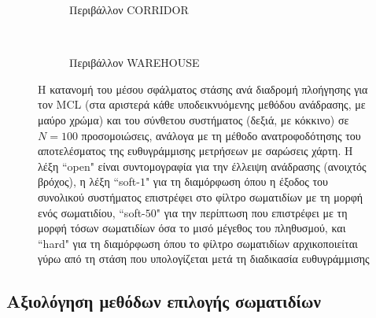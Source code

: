 \begin{figure}
  \vspace{2cm}
  \begin{subfigure}{\linewidth}
  \hspace{-1.25cm}
    
    \vspace{0.3cm}
    \caption{Περιβάλλον CORRIDOR}
    \label{}
  \end{subfigure}\\
  \begin{subfigure}{\linewidth}\vspace{0.5cm}
    \hspace{-1.25cm}
    
    \vspace{0.3cm}
    \caption{Περιβάλλον WAREHOUSE}
    \label{}
  \end{subfigure}
\caption{\small Η κατανομή του μέσου σφάλματος στάσης ανά διαδρομή πλοήγησης
         για τον MCL (στα αριστερά κάθε υποδεικνυόμενης μεθόδου ανάδρασης, με
         μαύρο χρώμα) και του σύνθετου συστήματος (δεξιά, με κόκκινο) σε
         $N=100$ προσομοιώσεις, ανάλογα με τη μέθοδο ανατροφοδότησης του
         αποτελέσματος της ευθυγράμμισης μετρήσεων με σαρώσεις χάρτη. Η λέξη
         ``open" είναι συντομογραφία για την έλλειψη ανάδρασης (ανοιχτός
         βρόχος), η λέξη ``soft-$1$" για τη διαμόρφωση όπου η έξοδος του
         συνολικού συστήματος επιστρέφει στο φίλτρο σωματιδίων με τη μορφή ενός
         σωματιδίου, ``soft-$50$" για την περίπτωση που επιστρέφει με τη μορφή
         τόσων σωματιδίων όσα το μισό μέγεθος του πληθυσμού, και ``hard" για τη
         διαμόρφωση όπου το φίλτρο σωματιδίων αρχικοποιείται γύρω από τη στάση
         που υπολογίζεται μετά τη διαδικασία ευθυγράμμισης}
\label{fig:02_02_04:feedbacks}
\end{figure}


\subsection{Αξιολόγηση μεθόδων επιλογής σωματιδίων}
\label{subsection:02_02_04:03}

